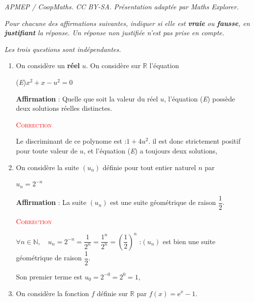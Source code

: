 \documentclass[10pt]{article}
\providecommand{\N}{\mathbb{N}}
\providecommand{\e}{{\mathrm{e}}}
\begin{document}
\noindent\textit{APMEP / CoopMaths. CC BY-SA. Présentation adaptée par Maths Explorer.}\par\medskip
\textit{Pour chacune des affirmations suivantes, indiquer si elle est \textbf{vraie} ou \textbf{fausse}, en \textbf{justifiant} la réponse. Un réponse non justifiée n'est pas prise en compte.}

\begin{center}
	\textit{Les trois questions sont indépendantes.}
\end{center}

\begin{enumerate}
	\item On considère un \textbf{réel} $u$. On considère sur $\mathbb{R}$ l'équation

	\begin{center}
		(\textit{E})\hspace{10mm}\mbox{$x^2+x-u^2=0$}
		\end{center}

		\textbf{Affirmation} : Quelle que soit la valeur du réel $u$, l'équation (\textit{E}) possède deux solutions réelles distinctes.


		\textcolor{red}{\textsc{Correction}}


		Le discriminant de ce polynome est :\quad \mbox{$1+4u^2$}.
		il est donc strictement positif pour toute valeur de $u$, et l'équation (\textit{E}) a toujours deux solutions,

		\hfill {}

		\item On considère la suite \mbox{$(u_n)$} définie pour tout entier naturel $n$ par

		\begin{center}
			\mbox{$u_n=2^{-n}$}
		\end{center}

		\textbf{Affirmation} : La suite \mbox{$(u_n)$} est une suite géométrique de raison \mbox{$\dfrac12$}.


		\textcolor{red}{\textsc{Correction}}


		\mbox{$\forall n\in\N, \quad u_n=2^{-n}=\dfrac{1}{2^n}=\dfrac{1^n}{2^n}=\left(\dfrac{1}{2}\right) ^n$} :\quad \mbox{$(u_n)$} est bien une suite géométrique de raison \mbox{$\dfrac12$}.

		Son premier terme est \quad $u_0 = 2^{-0} = 2^0 = 1$,

		\hfill {}

		\item On considère la fonction $f$ définie sur $\mathbb{R}$ par \mbox{$f(x)=\e^x-1$}.


\end{enumerate}
\end{document}
